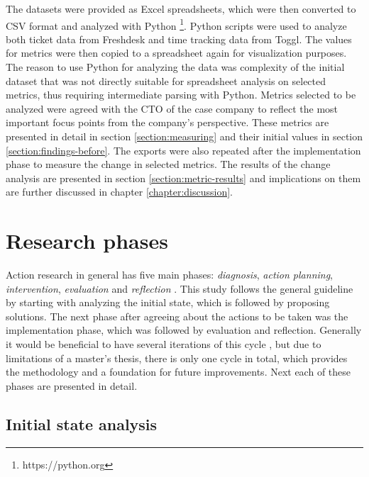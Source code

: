 The datasets were provided as Excel spreadsheets, which were then converted to CSV format and analyzed with Python \footnote{https://python.org}. Python scripts were
used to analyze both ticket data from Freshdesk and time tracking data from Toggl. The values for metrics were then copied to a spreadsheet again for visualization purposes.
The reason to use Python for analyzing the data was complexity of the initial dataset that was not directly suitable for spreadsheet analysis on selected metrics, thus
requiring intermediate parsing with Python. Metrics selected to be analyzed were agreed with the CTO of the case company to reflect the most important focus points from
the company's perspective. These metrics are presented in detail in section \ref{section:measuring} and their initial values in section \ref{section:findings-before}.
The exports were also repeated after the implementation phase to measure the change in selected metrics. The results of the change analysis are presented in section \ref{section:metric-results}
and implications on them are further discussed in chapter \ref{chapter:discussion}.

\section{Research phases}
\label{section:phases}

Action research in general has five main phases: \emph{diagnosis}, \emph{action planning}, \emph{intervention}, \emph{evaluation} and \emph{reflection} \citep{Davison2004}.
This study follows the general guideline by starting with analyzing the initial state, which is followed by proposing solutions. The next
phase after agreeing about the actions to be taken was the implementation phase, which was followed by evaluation and reflection.
Generally it would be beneficial to have several iterations of this cycle
\citep{Davison2004}, but due to limitations of a master's thesis, there is only one cycle in total, which provides the methodology and a foundation for future improvements.
Next each of these phases are presented in detail.

\subsection{Initial state analysis}

